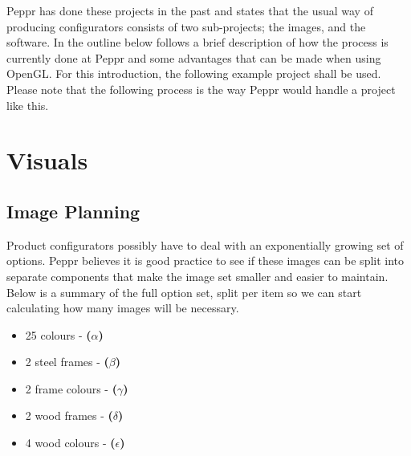 Peppr has done these projects in the past and states that the usual way of producing configurators consists of two sub-projects; the images, and the software. In the outline below follows a brief description of how the process is currently done at Peppr and some advantages that can be made when using OpenGL.
For this introduction, the following example project shall be used. Please note that the following process is the way Peppr would handle a project like this.
\newline
{}

\section{Visuals}

\subsection{Image Planning}
Product configurators possibly have to deal with an exponentially growing set of options. Peppr believes it is good practice to see if these images can be split into separate components that make the image set smaller and easier to maintain. Below is a summary of the full option set, split per item so we can start calculating how many images will be necessary.
\begin{itemize}
	\item 25 colours - \textbf{(\( \alpha \))}
	\item 2 steel frames - \textbf{(\( \beta \))}
	\item 2 frame colours - \textbf{(\( \gamma \))}
	\item 2 wood frames - \textbf{(\( \delta \))}
	\item 4 wood colours - \textbf{(\( \epsilon \))}
\end{itemize}

